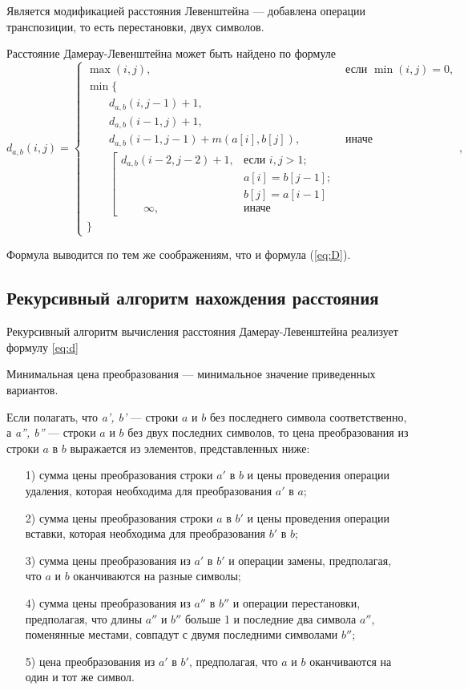 Является модификацией расстояния Левенштейна --- добавлена операции транспозиции, то есть перестановки, двух символов.

Расстояние Дамерау-Левенштейна может быть найдено по формуле
\begin{equation}
	\label{eq:d}
	d_{a,b}(i, j) = \begin{cases}
		\max(i, j), &\text{если }\min(i, j) = 0,\\
		\min \lbrace \\
		\qquad d_{a,b}(i, j-1) + 1,\\
		\qquad d_{a,b}(i-1, j) + 1,\\
		\qquad d_{a,b}(i-1, j-1) + m(a[i], b[j]), &\text{иначе}\\
		\qquad \left[ \begin{array}{cc}d_{a,b}(i-2, j-2) + 1, &\text{если }i,j > 1;\\
			\qquad &\text{}a[i] = b[j-1]; \\
			\qquad &\text{}b[j] = a[i-1]\\
			\qquad \infty, & \text{иначе}\end{array}\right.\\
		\rbrace
	\end{cases},
\end{equation}

Формула выводится по тем же соображениям, что и формула (\ref{eq:D}).

\subsection{Рекурсивный алгоритм нахождения расстояния}
Рекурсивный алгоритм вычисления расстояния Дамерау-Левенштейна реализует формулу \ref{eq:d}

Минимальная цена преобразования --- минимальное значение приведенных вариантов.

Если полагать, что \textit{a', b'} --- строки $a$ и $b$ без последнего символа соответственно, а \textit{a'', b''} --- строки $a$ и $b$ без двух последних символов, то цена преобразования из строки $a$ в $b$ выражается из элементов, представленных ниже:
\begin{enumerate}
	\item[1)] сумма цены преобразования строки $a'$ в $b$ и цены проведения операции удаления, которая необходима для преобразования $a'$ в $a$;
	\item[2)] сумма цены преобразования строки $a$ в $b'$  и цены проведения операции вставки, которая необходима для преобразования $b'$ в $b$;	
	\newpage
	\item[3)] сумма цены преобразования из $a'$ в $b'$ и операции замены, предполагая, что $a$ и $b$ оканчиваются на разные символы;
	\item[4)] сумма цены преобразования из $a''$ в $b''$ и операции перестановки, предполагая, что длины $a''$ и $b''$ больше 1 и последние два символа $a''$, поменянные местами, совпадут с двумя последними символами $b''$;
	\item[5)] цена преобразования из $a'$ в $b'$, предполагая, что $a$ и $b$ оканчиваются на один и тот же символ.
\end{enumerate}


